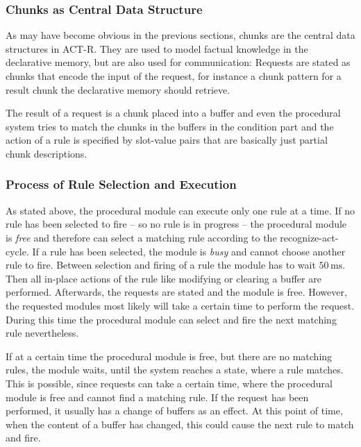 \subsubsection{Chunks as Central Data Structure}

As may have become obvious in the previous sections, chunks are the central data structures in ACT-R. They are used to model factual knowledge in the declarative memory, but are also used for communication: Requests are stated as chunks that encode the input of the request, for instance a chunk pattern for a result chunk the declarative memory should retrieve. 

The result of a request is a chunk placed into a buffer and even the procedural system tries to match the chunks in the buffers in the condition part and the action of a rule is specified by slot-value pairs that are basically just partial chunk descriptions. 

\subsubsection{Process of Rule Selection and Execution}
\label{process_of_rule_selection_and_execution}

As stated above, the procedural module can execute only one rule at a time. If no rule has been selected to fire -- so no rule is in progress -- the procedural module is \emph{free} and therefore can select a matching rule according to the recognize-act-cycle. If a rule has been selected, the module is \emph{busy} and cannot choose another rule to fire. Between selection and firing of a rule the module has to wait $50\,\mathrm{ms}$. Then all in-place actions of the rule like modifying or clearing a buffer are performed. Afterwards, the requests are stated and the module is free. However, the requested modules most likely will take a certain time to perform the request. During this time the procedural module can select and fire the next matching rule nevertheless.

If at a certain time the procedural module is free, but there are no matching rules, the module waits, until the system reaches a state, where a rule matches. This is possible, since requests can take a certain time, where the procedural module is free and cannot find a matching rule. If the request has been performed, it usually has a change of buffers as an effect. At this point of time, when the content of a buffer has changed, this could cause the next rule to match and fire.

